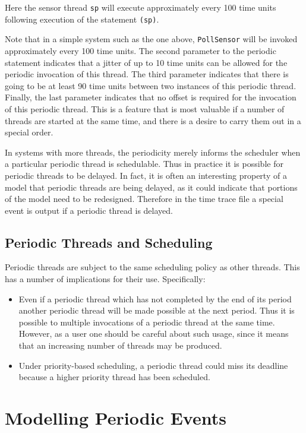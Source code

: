 \documentclass{overturerepchap}
\begin{document}
Here the sensor thread \texttt{sp} will execute approximately 
every 100 time units
following execution of the statement {\bf{}}\texttt{(sp)}.

Note that in a simple system such as the one above,
\texttt{PollSensor} will be invoked approximately every 100 time
units. The second parameter to the periodic statement indicates that a
jitter of up to 10 time units can be allowed for the periodic invocation of this
thread. The third parameter indicates that there is going to be at
least 90 time units between two instances of this periodic
thread. Finally, the last parameter indicates that no offset is
required for the invocation of this periodic thread. This is a feature
that is most valuable if a number of threads are started at the same
time, and there is a desire to carry them out in a special order.

In systems with more threads, the periodicity merely
informs the scheduler when a particular periodic thread is
schedulable. Thus in practice it is possible for periodic threads to
be delayed. In fact, it is often an interesting property of a model
that periodic threads are being delayed, as it could indicate that
portions of the model need to be redesigned. Therefore in the time
trace file a special event is output if a periodic thread is delayed.

\subsection{Periodic Threads and Scheduling}

Periodic threads are subject to the same scheduling policy as other
threads. This has a number of implications for their
use. Specifically:

\begin{itemize}
\item Even if a periodic thread which has not
completed by the end of its period another periodic thread will be
made possible at the next period. Thus it is possible to multiple
invocations of a periodic thread at the same time. However, as a user
one should be careful about such usage, since it means that an
increasing number of threads may be produced.
\item Under priority-based scheduling, a periodic thread could miss
its deadline because a higher priority thread has been scheduled.
\end{itemize}

\section{Modelling Periodic Events}\label{sec:modperevents}
\end{document}
